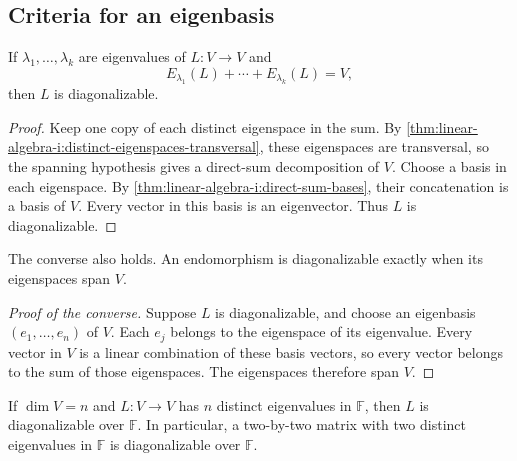 \subsection{Criteria for an eigenbasis}

\begin{theorem}
  \label{thm:linear-algebra-i:spanning-eigenspaces-diagonalizable}
  If \(\lambda_1,\ldots,\lambda_k\) are eigenvalues of \(L:V\to V\)
  and
  \[
    E_{\lambda_1}(L)+\cdots+E_{\lambda_k}(L)=V,
  \]
  then \(L\) is diagonalizable.
\end{theorem}

\begin{proof}
  Keep one copy of each distinct eigenspace in the sum. By
  \autoref{thm:linear-algebra-i:distinct-eigenspaces-transversal}, these
  eigenspaces are transversal, so the spanning hypothesis gives a
  direct-sum decomposition of \(V\). Choose a basis in each eigenspace.
  By \autoref{thm:linear-algebra-i:direct-sum-bases}, their concatenation
  is a basis of \(V\). Every vector in this basis is an eigenvector.
  Thus \(L\) is diagonalizable.
\end{proof}

The converse also holds. An endomorphism is diagonalizable exactly when
its eigenspaces span \(V\).
\begin{pendingreview}
\begin{proof}[Proof of the converse]
  Suppose \(L\) is diagonalizable, and choose an eigenbasis
  \((e_1,\ldots,e_n)\) of \(V\). Each \(e_j\) belongs to the
  eigenspace of its eigenvalue. Every vector in \(V\) is a linear
  combination of these basis vectors, so every vector belongs to the sum
  of those eigenspaces. The eigenspaces therefore span \(V\).
\end{proof}
\end{pendingreview}

\begin{corollary}
  \label{thm:linear-algebra-i:distinct-eigenvalues-diagonalizable}
  If \(\dim V=n\) and \(L:V\to V\) has \(n\) distinct eigenvalues
  in \(\mathbb F\), then \(L\) is diagonalizable over \(\mathbb F\).
  In particular, a two-by-two matrix with two distinct eigenvalues in
  \(\mathbb F\) is diagonalizable over \(\mathbb F\).
\end{corollary}

